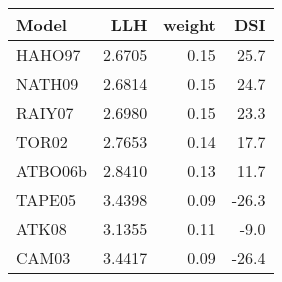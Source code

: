 \begin{tabular}{lrrr}
\toprule
   Model &     LLH &  weight &   DSI \\
\midrule
  HAHO97 &  2.6705 &    0.15 &  25.7 \\
  NATH09 &  2.6814 &    0.15 &  24.7 \\
  RAIY07 &  2.6980 &    0.15 &  23.3 \\
   TOR02 &  2.7653 &    0.14 &  17.7 \\
 ATBO06b &  2.8410 &    0.13 &  11.7 \\
  TAPE05 &  3.4398 &    0.09 & -26.3 \\
   ATK08 &  3.1355 &    0.11 &  -9.0 \\
   CAM03 &  3.4417 &    0.09 & -26.4 \\
\bottomrule
\end{tabular}
